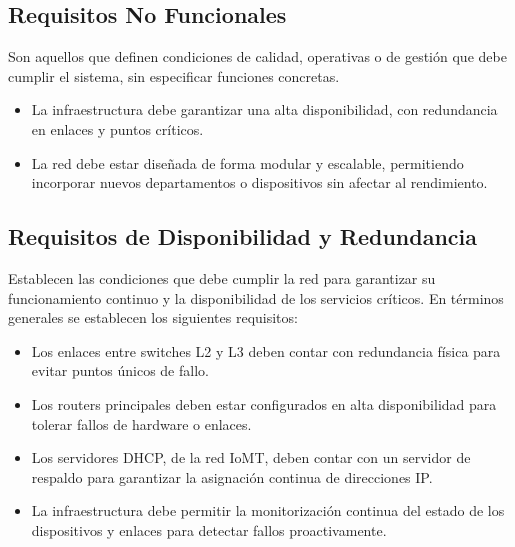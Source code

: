 \subsection{Requisitos No Funcionales}
Son aquellos que definen condiciones de calidad, operativas o de gestión que debe cumplir el sistema, sin especificar funciones concretas.
\begin{itemize}
    \item La infraestructura debe garantizar una alta disponibilidad, con redundancia en enlaces y puntos críticos.
    \item La red debe estar diseñada de forma modular y escalable, permitiendo incorporar nuevos departamentos o dispositivos sin afectar al rendimiento.
\end{itemize}
\subsection{Requisitos de Disponibilidad y Redundancia}
Establecen las condiciones que debe cumplir la red para garantizar su funcionamiento continuo y la disponibilidad de los servicios críticos. En términos generales se establecen los siguientes requisitos:
\begin{itemize}
    \item Los enlaces entre switches L2 y L3 deben contar con redundancia física para evitar puntos únicos de fallo.
    \item Los routers principales deben estar configurados en alta disponibilidad para tolerar fallos de hardware o enlaces.
    \item Los servidores DHCP, de la red IoMT, deben contar con un servidor de respaldo para garantizar la asignación continua de direcciones IP.
    \item La infraestructura debe permitir la monitorización continua del estado de los dispositivos y enlaces para detectar fallos proactivamente.
\end{itemize}


